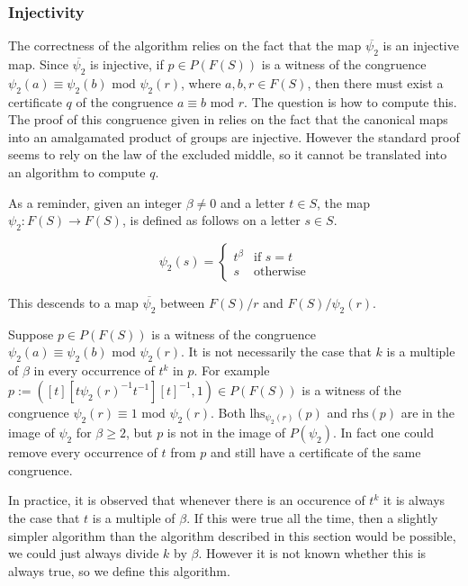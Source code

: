 \documentclass[12pt]{article} %
\theoremstyle{definition}
\theoremstyle{definition}
\theoremstyle{definition}
\theoremstyle{definition}
\begin{document}
\subsubsection{Injectivity}\label{powproofs}

The correctness of the algorithm relies on the fact that the map
$\overline{\psi_2}$ is an injective map.
Since $\overline{\psi_2}$ is injective, if $p \in P(F(S))$ is a witness of the congruence
$\psi_2(a) \equiv \psi_2(b) \text{ mod } \psi_2(r)$, where $a, b, r \in F(S)$,
then there must exist a certificate
$q$ of the congruence $a \equiv b \text{ mod }r$. The question is how to compute this. The proof
of this congruence given in \cite{PutmanOneRelator}
relies on the fact that the canonical maps into an amalgamated product
of groups are injective. However the standard proof
seems to rely on the law of the excluded middle, so
it cannot be translated into an algorithm to compute $q$.

As a reminder, given an integer $\beta \ne 0$ and a letter $t \in S$,
the map $\psi_2 : F(S) \to F(S)$, is defined as follows on a letter $s \in S$.

\begin{equation}
  \psi_2(s) =
  \begin{cases}
     t^\beta & \text{if } s = t \\
     s & \text{otherwise}
  \end{cases}
\end{equation}

This descends to a map $\overline{\psi_2}$ between $F(S) / r$
and $F(S) / \psi_2(r)$.

Suppose $p \in P(F(S))$ is a witness of the congruence
$\psi_2(a) \equiv \psi_2(b) \text{ mod } \psi_2(r)$. It is not necessarily the case that $k$
is a multiple of $\beta$ in every occurrence of $t^k$ in $p$. For example
$p := ([t][t\psi_2(r)^{-1}t^{-1}][t]^{-1}, 1) \in P(F(S))$ is a witness of the congruence
$\psi_2(r) \equiv 1 \text{ mod } \psi_2(r)$. Both $\text{lhs}_{\psi_2(r)}(p)$
and $\text{rhs}(p)$ are in the image of
$\psi_2$ for $\beta \ge 2$,
but $p$ is not in the image of $P(\psi_2)$. In fact
one could remove every occurrence of $t$ from $p$ and still have a certificate of the same
congruence.

In practice, it is observed that whenever there is an occurence of $t^k$ it is always
the case that $t$ is a multiple of $\beta$. If this were true all the time, then a slightly
simpler algorithm than the algorithm described in this section would be possible,
we could just always divide $k$ by $\beta$. However it is not known whether this is always
true, so we define this algorithm.
\end{document}
